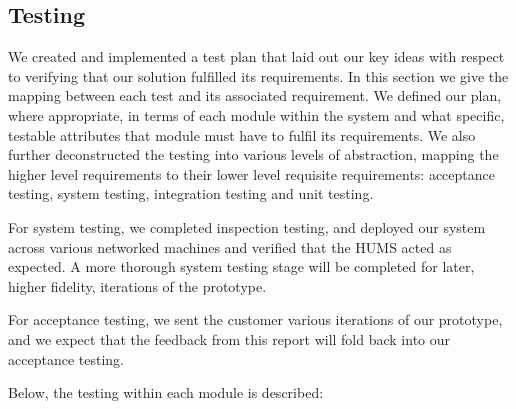 \documentclass[10pt,a4paper]{article}
\begin{document}
\subsection{Testing} 
We created and implemented a test plan that laid out our key ideas
with respect to verifying that our solution fulfilled its
requirements. In this section we give the mapping between each
test and its associated requirement. We
defined our plan, where appropriate, in terms of each module within
the system and what specific, testable attributes that module must
have to fulfil its requirements. We also further deconstructed the
testing into various levels of abstraction, mapping the higher level
requirements to their lower level requisite requirements: acceptance
testing, system testing, integration testing and unit
testing.


For system testing, we completed inspection testing, and deployed our system across various networked machines and verified that the HUMS acted as expected. A more thorough system testing stage will be completed for later, higher fidelity, iterations of the prototype.

For acceptance testing, we sent the customer various iterations of our prototype, and we expect that the feedback from this report will fold back into our acceptance testing.

Below, the testing within each module is described:
\end{document}
